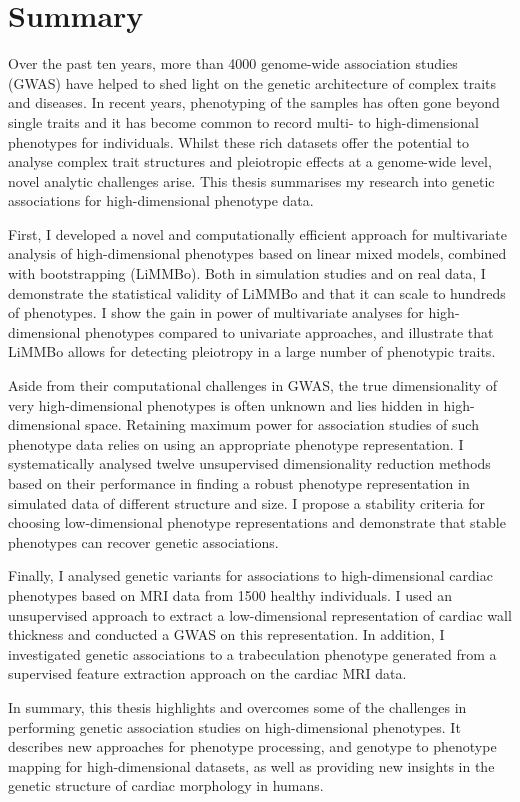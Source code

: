 \clearpage
\chapter*{Summary}
\label{section:summary}

\begin{singlespace}
Over the past ten years, more than \num{4000} genome-wide association studies (GWAS) have helped to shed light on the genetic architecture of complex traits and diseases. In recent years, phenotyping of the samples has often gone beyond single traits and it has become common to record multi- to high-dimensional phenotypes for individuals. Whilst these rich datasets offer the potential to analyse complex trait structures and pleiotropic effects at a genome-wide level, novel analytic challenges arise. This thesis summarises my research into genetic associations for high-dimensional phenotype data.

First, I developed a novel and computationally efficient approach for multivariate analysis of high-dimensional phenotypes based on linear mixed models, combined with bootstrapping (LiMMBo). Both in simulation studies and on real data, I demonstrate the statistical validity of LiMMBo and that it can scale to hundreds of phenotypes. I show the gain in power of multivariate analyses for high-dimensional phenotypes compared to univariate approaches, and illustrate that LiMMBo allows for detecting pleiotropy in a large number of phenotypic traits.

Aside from their computational challenges in GWAS, the true dimensionality of very high-dimensional phenotypes is often unknown and lies hidden in high-dimensional space. Retaining maximum power for association studies of such phenotype data relies on using an appropriate phenotype representation. I systematically analysed twelve unsupervised dimensionality reduction methods based on their performance in finding a robust phenotype representation in simulated data of different structure and size. I propose a stability criteria for choosing low-dimensional phenotype representations and demonstrate that stable phenotypes can recover genetic associations.

Finally, I analysed genetic variants for associations to high-dimensional cardiac phenotypes based on MRI data from \num{1500} healthy individuals. I used an unsupervised approach to extract a low-dimensional representation of cardiac wall thickness and conducted a GWAS on this representation. In addition, I investigated genetic associations to a trabeculation phenotype generated from a supervised feature extraction approach on the cardiac MRI data.

In summary, this thesis highlights and overcomes some of the challenges in performing genetic association studies on high-dimensional phenotypes. It describes new approaches for phenotype processing, and genotype to phenotype mapping for high-dimensional datasets, as well as providing new insights in the genetic structure of cardiac morphology in humans.


\end{singlespace}


